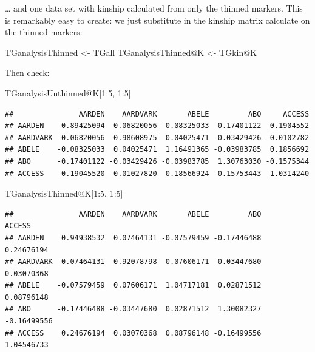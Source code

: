 \documentclass[
]{book}
\newenvironment{Shaded}{\begin{snugshade}}{\end{snugshade}}
\newcommand{\DecValTok}[1]{\textcolor[rgb]{0.00,0.00,0.81}{#1}}
\newcommand{\NormalTok}[1]{#1}
\newcommand{\OtherTok}[1]{\textcolor[rgb]{0.56,0.35,0.01}{#1}}
\newcommand{\SpecialCharTok}[1]{\textcolor[rgb]{0.00,0.00,0.00}{#1}}
\begin{document}
\ldots{} and one data set with kinship calculated from only the thinned markers. This is remarkably easy to create: we just substitute in the kinship matrix calculate on the thinned markers:

\begin{Shaded}
\begin{Highlighting}[]
\NormalTok{TGanalysisThinned }\OtherTok{\textless{}{-}}\NormalTok{ TGall}
\NormalTok{TGanalysisThinned}\SpecialCharTok{@}\NormalTok{K }\OtherTok{\textless{}{-}}\NormalTok{ TGkin}\SpecialCharTok{@}\NormalTok{K}
\end{Highlighting}
\end{Shaded}

Then check:

\begin{Shaded}
\begin{Highlighting}[]
\NormalTok{TGanalysisUnthinned}\SpecialCharTok{@}\NormalTok{K[}\DecValTok{1}\SpecialCharTok{:}\DecValTok{5}\NormalTok{, }\DecValTok{1}\SpecialCharTok{:}\DecValTok{5}\NormalTok{]}
\end{Highlighting}
\end{Shaded}

\begin{verbatim}
##               AARDEN    AARDVARK       ABELE         ABO     ACCESS
## AARDEN    0.89425094  0.06820056 -0.08325033 -0.17401122  0.1904552
## AARDVARK  0.06820056  0.98608975  0.04025471 -0.03429426 -0.0102782
## ABELE    -0.08325033  0.04025471  1.16491365 -0.03983785  0.1856692
## ABO      -0.17401122 -0.03429426 -0.03983785  1.30763030 -0.1575344
## ACCESS    0.19045520 -0.01027820  0.18566924 -0.15753443  1.0314240
\end{verbatim}

\begin{Shaded}
\begin{Highlighting}[]
\NormalTok{TGanalysisThinned}\SpecialCharTok{@}\NormalTok{K[}\DecValTok{1}\SpecialCharTok{:}\DecValTok{5}\NormalTok{, }\DecValTok{1}\SpecialCharTok{:}\DecValTok{5}\NormalTok{]}
\end{Highlighting}
\end{Shaded}

\begin{verbatim}
##               AARDEN    AARDVARK       ABELE         ABO      ACCESS
## AARDEN    0.94938532  0.07464131 -0.07579459 -0.17446488  0.24676194
## AARDVARK  0.07464131  0.92078798  0.07606171 -0.03447680  0.03070368
## ABELE    -0.07579459  0.07606171  1.04717181  0.02871512  0.08796148
## ABO      -0.17446488 -0.03447680  0.02871512  1.30082327 -0.16499556
## ACCESS    0.24676194  0.03070368  0.08796148 -0.16499556  1.04546733
\end{verbatim}
\end{document}
